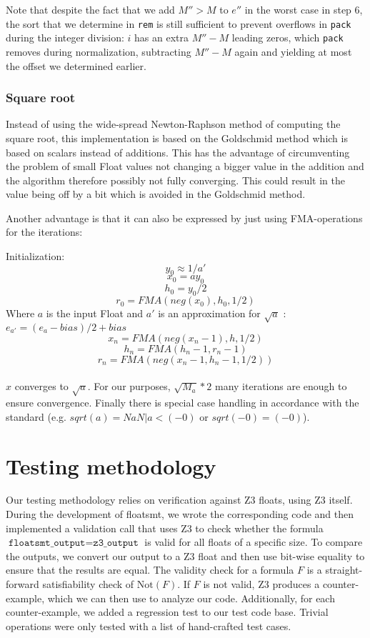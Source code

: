 \documentclass[a4paper,UKenglish,cleveref, autoref, thm-restate]{lipics-v2019}
\begin{document}
Note that despite the fact that we add $M'' > M$ to $e''$ in the worst case in step 6, the sort that we determine in \verb|rem| is still sufficient to prevent overflows in \verb|pack| during the integer division: $i$ has an extra $M'' - M$ leading zeros, which \verb|pack| removes during normalization, subtracting $M'' - M$ again and yielding at most the offset we determined earlier. 

\subsubsection{Square root}
Instead of using the wide-spread Newton-Raphson method of computing the square root, this implementation is based on the Goldschmid method which is based on scalars instead of additions. This has the advantage of circumventing the problem of small Float values not changing a bigger value in the addition and the algorithm therefore possibly not fully converging. This could result in the value being off by a bit which is avoided in the Goldschmid method. 

Another advantage is that it can also be expressed by just using FMA-operations for the iterations:

Initialization:
\[ 
	y_0 \approx 1/a'
\]
\[
	x_0 = ay_0
\]
\[
	h_0 = y_0/2
\]
\[
	r_0 = FMA(neg(x_0), h_0, 1/2)
\]
Where $a$ is the input Float and $a'$ is an approximation for $\sqrt{a}$ : $ e_{a'} = (e_a - bias) / 2 + bias$
\[
x_n = FMA(neg(x_n-1), h , 1/2)
\]
\[
h_n = FMA(h_n-1, r_n-1)
\]
\[
r_n = FMA(neg(x_n-1, h_n-1, 1/2))	
\]
\\
$x$ converges to $\sqrt{a}$. For our purposes, $\sqrt{M_a} * 2$ many iterations are enough to ensure convergence.
Finally there is special case handling in accordance with the standard (e.g. $sqrt(a) = NaN | a < (-0)$ or $sqrt(-0) = (-0)$).

\section{Testing methodology}
Our testing methodology relies on verification against Z3 floats, using Z3 itself. During the development of floatsmt, we wrote the corresponding code and then implemented a validation call that uses Z3 to check whether the formula $\texttt{floatsmt\_output} = \texttt{z3\_output}$ is valid for all floats of a specific size. To compare the outputs, we convert our output to a Z3 float and then use bit-wise equality to ensure that the results are equal. The validity check for a formula $F$ is a straight-forward satisfiability check of $\text{Not}(F)$. If $F$ is not valid, Z3 produces a counter-example, which we can then use to analyze our code. Additionally, for each counter-example, we added a regression test to our test code base. Trivial operations were only tested with a list of hand-crafted test cases.
\end{document}
